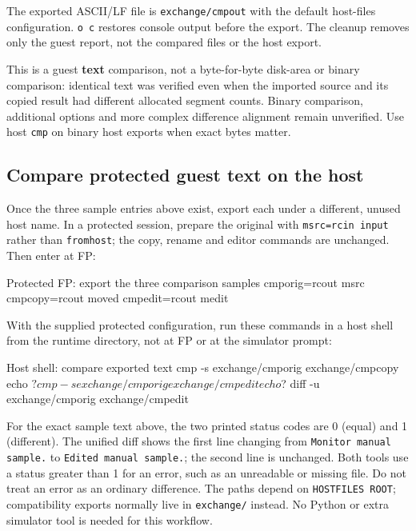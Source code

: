 The exported ASCII/LF file is \passthrough{\lstinline!exchange/cmpout!} with the default host-files configuration. \passthrough{\lstinline!o c!} restores console output before the export. The cleanup removes only the guest report, not the compared files or the host export.

This is a guest \textbf{text} comparison, not a byte-for-byte disk-area or binary comparison: identical text was verified even when the imported source and its copied result had different allocated segment counts. Binary comparison, additional options and more complex difference alignment remain unverified. Use host \passthrough{\lstinline!cmp!} on binary host exports when exact bytes matter.

\subsection{Compare protected guest text on the host}\label{compare-protected-text-on-host}

Once the three sample entries above exist, export each under a different,
unused host name. In a protected session, prepare the original with
\texttt{msrc=rcin input} rather than \texttt{fromhost}; the copy, rename and
editor commands are unchanged. Then enter at FP:

\begin{commandexample}{Protected FP: export the three comparison samples}
cmporig=rcout msrc
cmpcopy=rcout moved
cmpedit=rcout medit
\end{commandexample}

With the supplied protected configuration, run these commands in a host shell
from the runtime directory, not at FP or at the simulator prompt:

\begin{commandexample}[language=sh]{Host shell: compare exported text}
cmp -s exchange/cmporig exchange/cmpcopy
echo $?
cmp -s exchange/cmporig exchange/cmpedit
echo $?
diff -u exchange/cmporig exchange/cmpedit
\end{commandexample}

For the exact sample text above, the two printed status codes are 0 (equal)
and 1 (different). The unified diff shows the first line changing from
\texttt{Monitor manual sample.} to \texttt{Edited manual sample.}; the second
line is unchanged. Both tools use a status greater than 1 for an error, such
as an unreadable or missing file. Do not treat an error as an ordinary
difference. The paths depend on \texttt{HOSTFILES ROOT}; compatibility exports
normally live in \texttt{exchange/} instead. No Python or extra simulator tool
is needed for this workflow.

